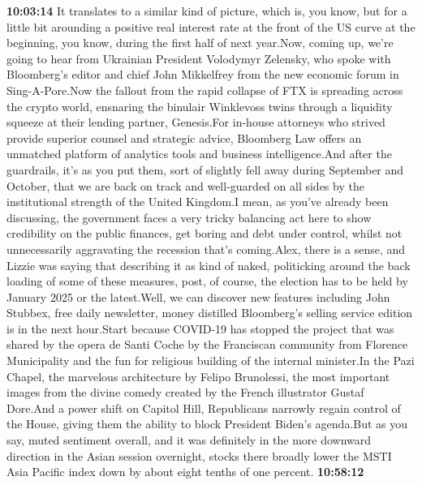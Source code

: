 \documentclass{article}%
\begin{document}
\textbf{10:03:14}%
\newline%
It translates to a similar kind of picture, which is, you know, but for a little bit arounding a positive real interest rate at the front of the US curve at the beginning, you know, during the first half of next year.Now, coming up, we're going to hear from Ukrainian President Volodymyr Zelensky, who spoke with Bloomberg's editor and chief John Mikkelfrey from the new economic forum in Sing{-}A{-}Pore.Now the fallout from the rapid collapse of FTX is spreading across the crypto world, ensnaring the binulair Winklevoss twins through a liquidity squeeze at their lending partner, Genesis.For in{-}house attorneys who strived provide superior counsel and strategic advice, Bloomberg Law offers an unmatched platform of analytics tools and business intelligence.And after the guardrails, it's as you put them, sort of slightly fell away during September and October, that we are back on track and well{-}guarded on all sides by the institutional strength of the United Kingdom.I mean, as you've already been discussing, the government faces a very tricky balancing act here to show credibility on the public finances, get boring and debt under control, whilst not unnecessarily aggravating the recession that's coming.Alex, there is a sense, and Lizzie was saying that describing it as kind of naked, politicking around the back loading of some of these measures, post, of course, the election has to be held by January 2025 or the latest.Well, we can discover new features including John Stubbex, free daily newsletter, money distilled Bloomberg's selling service edition is in the next hour.Start because COVID{-}19 has stopped the project that was shared by the opera de Santi Coche by the Franciscan community from Florence Municipality and the fun for religious building of the internal minister.In the Pazi Chapel, the marvelous architecture by Felipo Brunolessi, the most important images from the divine comedy created by the French illustrator Gustaf Dore.And a power shift on Capitol Hill, Republicans narrowly regain control of the House, giving them the ability to block President Biden's agenda.But as you say, muted sentiment overall, and it was definitely in the more downward direction in the Asian session overnight, stocks there broadly lower the MSTI Asia Pacific index down by about eight tenths of one percent.%
\textbf{10:58:12}%
\newline%
\end{document}
